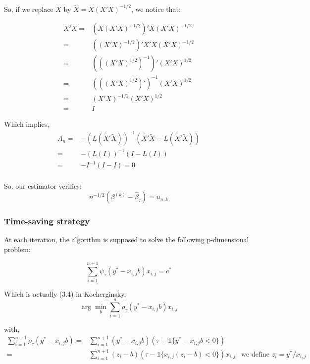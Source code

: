 \documentclass[11pt]{article}
\begin{document}
So, if we replace $X$ by $\tilde{X} = X(X'X)^{-1/2}$, we notice that:

\begin{align*}
\tilde{X}'\tilde{X} = & \left(X(X'X)^{-1/2}\right)'X(X'X)^{-1/2}\\
= &  \left((X'X)^{-1/2}\right)'X'X(X'X)^{-1/2}\\
= &  \left(((X'X)^{1/2})^{-1}\right)'(X'X)^{1/2}\\
= &  \left(((X'X)^{1/2})'\right)^{-1}(X'X)^{1/2}\\ %
= &  (X'X)^{-1/2}(X'X)^{1/2}\\
= & I
\end{align*}

Which implies,
\begin{align*}
A_{n} = &-\left(L(\tilde{X'}\tilde{X})\right)^{-1}\left(\tilde{X'}\tilde{X}-L(\tilde{X'}\tilde{X})\right)\\
= & -\left(L( I )\right)^{-1} \left( I -L( I) \right)\\
= & -I^{-1} \left( I -I \right) = 0\\
\end{align*}

So, our estimator verifies:
\begin{equation}
n^{-1/2}(\beta^{(k)}-\hat{\beta}_{\tau}) = u_{n,k}
\end{equation}



	\subsubsection{Time-saving strategy}
At each iteration, the algorithm is supposed to solve the following p-dimensional problem:

\begin{equation}
\sum_{i=1}^{n+1}\psi_{\tau}(y^{*}-x_{i,j}b)x_{i,j} = c^{*}
\end{equation}

Which is actually (3.4) in Kocherginsky,
\begin{equation}
\arg\min_{b}\sum_{i=1}^{n}\rho_{\tau}(y^{*}-x_{i,j}b)x_{i,j}
\end{equation}

with,
\begin{align*}
\sum_{i=1}^{n+1}\rho_{\tau}(y^{*}-x_{i,j}b)=&\sum_{i=1}^{n+1} (y^{*}-x_{i,j}b)(\tau-\mathds{1}\{y^{*}-x_{i,j}b<0\})\\
= & \sum_{i=1}^{n+1} (z_{i}-b)(\tau-\mathds{1}\{x_{i,j}(z_{i}-b)<0\}) x_{i,j} & \text{we define } z_{i}=y^{*}/x_{i,j}\\
\end{align*}
\end{document}
